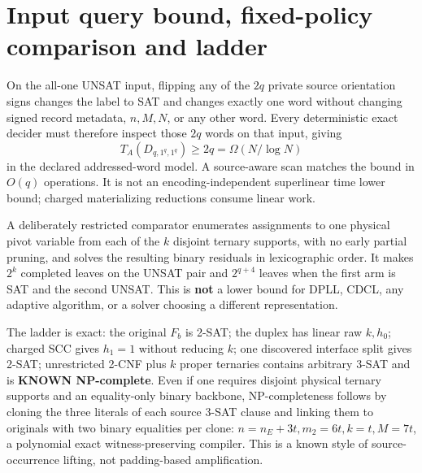 \documentclass[11pt]{article}
\begin{document}
\section{Input query bound, fixed-policy comparison and ladder}
On the all-one UNSAT input, flipping any of the $2q$ private
source orientation signs changes the label to SAT and changes
exactly one word without changing signed record metadata, $n,M,N$,
or any other word. Every deterministic exact decider must
therefore inspect those $2q$ words on that input, giving
\[
\boxed{T_A(D_{q,1^q,1^q})\ge 2q=\Omega(N/\log N)}
\]
in the declared addressed-word model. A source-aware scan matches
the bound in $O(q)$ operations. It is not an encoding-independent
superlinear time lower bound; charged materializing reductions
consume linear work.

A deliberately restricted comparator enumerates assignments to
one physical pivot variable from each of the $k$ disjoint
ternary supports, with no early partial pruning, and solves
the resulting binary residuals in lexicographic order. It makes
$2^k$ completed leaves on the UNSAT pair and $2^{q+4}$ leaves
when the first arm is SAT and the second UNSAT. This is
\textbf{not} a lower bound for DPLL, CDCL, any adaptive algorithm,
or a solver choosing a different representation.

The ladder is exact: the original $F_b$ is 2-SAT; the duplex has
linear raw $k,h_0$; charged SCC gives $h_1=1$ without reducing $k$;
one discovered interface split gives 2-SAT; unrestricted 2-CNF
plus $k$ proper ternaries contains arbitrary 3-SAT and is
\textbf{KNOWN NP-complete}. Even if one requires disjoint physical
ternary supports and an equality-only binary backbone,
NP-completeness follows by cloning the three literals of each
source 3-SAT clause and linking them to originals with two binary
equalities per clone: $n=n_E+3t,m_2=6t,k=t,M=7t$,
a polynomial exact witness-preserving compiler. This is a known
style of source-occurrence lifting, not padding-based amplification.
\end{document}
